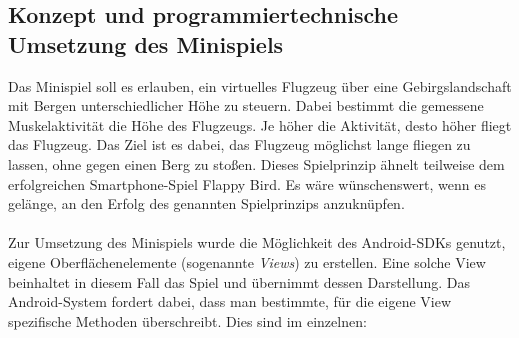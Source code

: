 \subsection{Konzept und programmiertechnische Umsetzung des Minispiels}
Das Minispiel soll es erlauben, ein virtuelles Flugzeug über eine Gebirgslandschaft mit Bergen unterschiedlicher Höhe zu steuern. Dabei bestimmt die gemessene Muskelaktivität die Höhe des Flugzeugs. Je höher die Aktivität, desto höher fliegt das Flugzeug. Das Ziel ist es dabei, das Flugzeug möglichst lange fliegen zu lassen, ohne gegen einen Berg zu stoßen. Dieses Spielprinzip ähnelt teilweise dem erfolgreichen Smartphone-Spiel \glqq Flappy Bird\grqq . Es wäre wünschenswert, wenn es gelänge, an den Erfolg des genannten Spielprinzips anzuknüpfen. \\ \\
Zur Umsetzung des Minispiels wurde die Möglichkeit des Android-SDKs genutzt, eigene Oberflächenelemente (sogenannte \textit{Views}\cite{Src:CustomView}) zu erstellen. Eine solche View beinhaltet in diesem Fall das Spiel und übernimmt dessen Darstellung. Das Android-System fordert dabei, dass man bestimmte, für die eigene View spezifische Methoden überschreibt. Dies sind im einzelnen:
